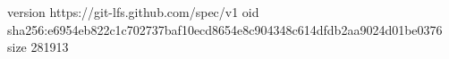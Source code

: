 version https://git-lfs.github.com/spec/v1
oid sha256:e6954eb822c1c702737baf10ecd8654e8c904348c614dfdb2aa9024d01be0376
size 281913
